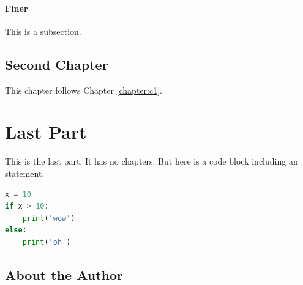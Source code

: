 \documentclass{kdp} %
\begin{document}
\subsection{Finer}
This is a subsection. 


\chapter{Second Chapter}
This chapter follows Chapter \ref{chapter:c1}.

\cleardoublepage
{}


\part{Last Part}\label{part:math}
This is the last part. It has no chapters. But here is a code block including an  statement.
\begin{lstlisting}[language = Python, caption = {[ifstatement.py]}]
x = 10
if x > 10:
    print('wow')
else:
    print('oh')
\end{lstlisting}


\backmatter

\printbibliography


\chapter*{About the Author}
\faHandPeaceO
\end{document}
